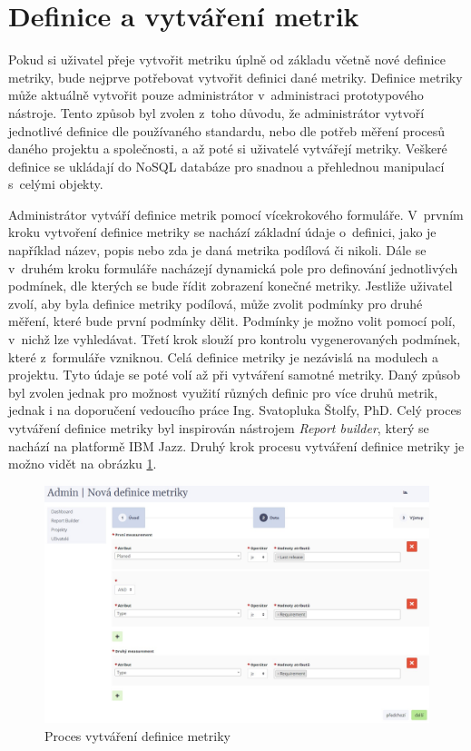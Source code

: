 \documentclass[czech,master]{diploma}
\begin{document}

\section{Definice a vytváření metrik}
\label{sec:definice_a_meriky}
Pokud si uživatel přeje vytvořit metriku úplně od základu včetně nové definice metriky, bude nejprve potřebovat vytvořit definici dané metriky. Definice metriky může aktuálně vytvořit pouze administrátor v~administraci prototypového nástroje. Tento způsob byl zvolen z~toho důvodu, že administrátor vytvoří jednotlivé definice dle používaného standardu, nebo dle potřeb měření procesů daného projektu a společnosti, a až poté si uživatelé vytvářejí metriky. Veškeré definice se ukládají do NoSQL databáze pro snadnou a přehlednou manipulací s~celými objekty.

Administrátor vytváří definice metrik pomocí vícekrokového formuláře. V~prvním kroku vytvoření definice metriky se nachází základní údaje o~definici, jako je například název, popis nebo zda je daná metrika podílová či nikoli. Dále se v~druhém kroku formuláře nacházejí dynamická pole pro definování jednotlivých podmínek, dle kterých se bude řídit zobrazení konečné metriky. Jestliže uživatel zvolí, aby byla definice metriky podílová, může zvolit podmínky pro druhé měření, které bude první podmínky dělit. Podmínky je možno volit pomocí polí, v~nichž lze vyhledávat. Třetí krok slouží pro kontrolu vygenerovaných podmínek, které z~formuláře vzniknou. Celá definice metriky je nezávislá na modulech a projektu. Tyto údaje se poté volí až při vytváření samotné metriky. Daný způsob byl zvolen jednak pro možnost využití různých definic pro více druhů metrik, jednak i na doporučení vedoucího práce Ing. Svatopluka Štolfy, PhD. Celý proces vytváření definice metriky byl inspirován nástrojem \textit{Report builder}, který se nachází na platformě IBM Jazz. Druhý krok procesu vytváření definice metriky je možno vidět na obrázku \ref{fig:report_builder_admin}.

\begin{figure}[!ht]
    \centering
    \includegraphics[width=1\textwidth]{Diplomka/Figures/report_builder.jpg}
    \caption{Proces vytváření definice metriky}
    \label{fig:report_builder_admin}
\end{figure}
\end{document}
